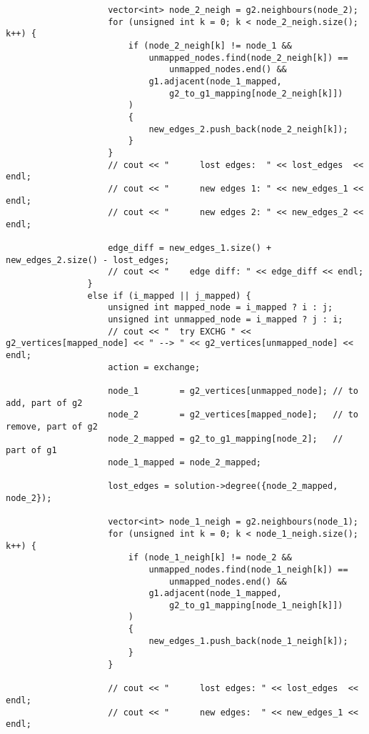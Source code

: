 \begin{lstlisting}
                    vector<int> node_2_neigh = g2.neighbours(node_2);
                    for (unsigned int k = 0; k < node_2_neigh.size(); k++) {
                        if (node_2_neigh[k] != node_1 &&
                            unmapped_nodes.find(node_2_neigh[k]) ==
                                unmapped_nodes.end() &&
                            g1.adjacent(node_1_mapped,
                                g2_to_g1_mapping[node_2_neigh[k]])
                        )
                        {
                            new_edges_2.push_back(node_2_neigh[k]);
                        }
                    }
                    // cout << "      lost edges:  " << lost_edges  << endl;
                    // cout << "      new edges 1: " << new_edges_1 << endl;
                    // cout << "      new edges 2: " << new_edges_2 << endl;

                    edge_diff = new_edges_1.size() + new_edges_2.size() - lost_edges;
                    // cout << "    edge diff: " << edge_diff << endl;
                }
                else if (i_mapped || j_mapped) {
                    unsigned int mapped_node = i_mapped ? i : j;
                    unsigned int unmapped_node = i_mapped ? j : i;
                    // cout << "  try EXCHG " << g2_vertices[mapped_node] << " --> " << g2_vertices[unmapped_node] << endl;
                    action = exchange;

                    node_1        = g2_vertices[unmapped_node]; // to add, part of g2
                    node_2        = g2_vertices[mapped_node];   // to remove, part of g2
                    node_2_mapped = g2_to_g1_mapping[node_2];   // part of g1
                    node_1_mapped = node_2_mapped;

                    lost_edges = solution->degree({node_2_mapped, node_2});

                    vector<int> node_1_neigh = g2.neighbours(node_1);
                    for (unsigned int k = 0; k < node_1_neigh.size(); k++) {
                        if (node_1_neigh[k] != node_2 &&
                            unmapped_nodes.find(node_1_neigh[k]) ==
                                unmapped_nodes.end() &&
                            g1.adjacent(node_1_mapped,
                                g2_to_g1_mapping[node_1_neigh[k]])
                        )
                        {
                            new_edges_1.push_back(node_1_neigh[k]);
                        }
                    }

                    // cout << "      lost edges: " << lost_edges  << endl;
                    // cout << "      new edges:  " << new_edges_1 << endl;


\end{lstlisting}
